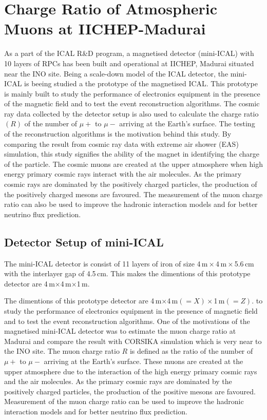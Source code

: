 
\chapter{Charge Ratio of Atmospheric Muons at IICHEP-Madurai}

As a part of the ICAL R\&D program, a magnetised detector (mini-ICAL)
with 10 layers of RPCs has been built and operational at IICHEP,
Madurai situated near the INO site. Being a scale-down model of the
ICAL detector, the mini-ICAL is beeing studied a the prototype of
the magnetised ICAL. This prototype is mainly built to study the
performance of electronics equipment in the presence of the magnetic
field and to test the event reconstruction algorithms.
The cosmic ray data collected by the
detector setup is also used to calculate the charge ratio $(R)$
of the number of $\mu+$ to $\mu-$ arriving at the Earth's surface.
The testing of the reconstruction algorithms is the motivation behind
this study. By comparing the result from cosmic ray data with extreme
air shower (EAS) simulation, this study signifies the ability of
the magnet in identifying the charge of the particle.
The cosmic muons are created at the upper atmosphere when high energy
primary cosmic rays interact with the air molecules.
As the primary cosmic rays are dominated by the positively charged
particles, the production of the positively charged mesons are
favoured. The measurement of the muon charge ratio can also be used
to improve the hadronic interaction models and for better neutrino
flux prediction.

\section{Detector Setup of mini-ICAL}
The mini-ICAL detector is consist of 11 layers of iron of size
4\,m\,$\times$\,4\,m\,$\times$\,5.6\,cm with the interlayer gap
of 4.5\,cm. This makes the dimentions of this prototype detector are
4\,m$\times$4\,m$\times$1\,m.

The dimentions of this
prototype detector are 4\,m$\times$4\,m$(=X)\times$1\,m$(=Z)$. to
study the performance of electronics equipment in the presence of
magnetic field and to test the event reconstruction algorithms. One of
the motivations of the magnetised mini-ICAL detector was to estimate
the muon charge ratio at Madurai and compare the result with CORSIKA
simulation which is very near to the INO site. The muon charge ratio
$R$ is defined as the ratio of the number of $\mu+$ to $\mu-$ arriving
at the Earth's surface. These muons are created at the upper
atmosphere due to the interaction of the high energy primary cosmic
rays and the air molecules. As the primary cosmic rays are dominated
by the positively charged particles, the production of the positive
mesons are favoured. Measurement of the muon charge ratio can be used
to improve the hadronic interaction models and for better neutrino
flux prediction.

